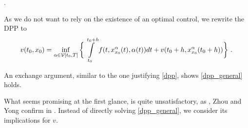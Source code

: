 	\begin{center}
		 .
	\end{center}

	As we do not want to rely on the existence of an optimal control, we rewrite the DPP to
	\begin{equation}
	\label{dpp_general}
	v(t_0, x_0) = \inf\limits_{\alpha \in \controlspace[t_0]} \bigg\{ \pathint{\alpha}{t_0}{t_0 + h} + v(t_0 + h, x^{\alpha}_{x_0}(t_0 + h)) \bigg\} \ .
	\end{equation}
	
	An exchange argument, similar to the one justifying \eqref{dpp}, shows \eqref{dpp_general} holds.
	
	What seems promising at the first glance, is quite unsatisfactory, as , Zhou and Yong confirm in \cite[p. ~160]{zhou}.
	Instead of directly solving \eqref{dpp_general}, we consider its implications for $ v $.